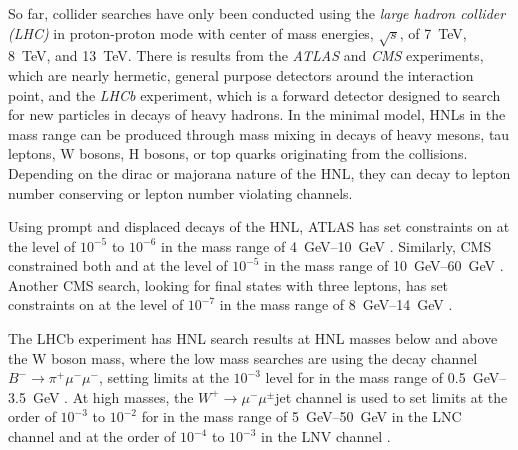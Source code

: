 So far, collider searches have only been conducted using the \textit{large hadron collider (LHC)} in proton-proton mode with center of mass energies, $\sqrt{s}$, of \SI{7}{\tera\electronvolt}, \SI{8}{\tera\electronvolt}, and \SI{13}{\tera\electronvolt}. There is results from the \textit{ATLAS} and \textit{CMS} experiments, which are nearly hermetic, general purpose detectors around the interaction point, and the \textit{LHCb} experiment, which is a forward detector designed to search for new particles in decays of heavy hadrons. In the minimal model, HNLs in the \si{\gev} mass range can be produced through mass mixing in decays of heavy mesons, tau leptons, W bosons, H bosons, or top quarks originating from the collisions. Depending on the dirac or majorana nature of the HNL, they can decay to lepton number conserving or lepton number violating channels.

Using prompt and displaced decays of the HNL, ATLAS has set constraints on  at the level of $10^{-5}$ to $10^{-6}$ in the mass range of \SIrange{4}{10}{\giga\electronvolt} . Similarly, CMS constrained both  and  at the level of $10^{-5}$ in the mass range of \SIrange{10}{60}{\giga\electronvolt} . Another CMS search, looking for final states with three leptons, has set constraints on  at the level of $10^{-7}$ in the mass range of \SIrange{8}{14}{\giga\electronvolt} .

The LHCb experiment has HNL search results at HNL masses below and above the W boson mass, where the low mass searches are using the decay channel $B^- \rightarrow \pi^+ \mu^- \mu^-$, setting limits at the $10^{-3}$ level for  in the mass range of \SIrange{0.5}{3.5}{\giga\electronvolt} . At high masses, the $W^+ \rightarrow \mu^- \mu^\pm$jet channel is used to set limits at the order of $10^{-3}$ to $10^{-2}$ for  in the mass range of \SIrange{5}{50}{\giga\electronvolt} in the LNC channel and at the order of $10^{-4}$ to $10^{-3}$ in the LNV channel .




